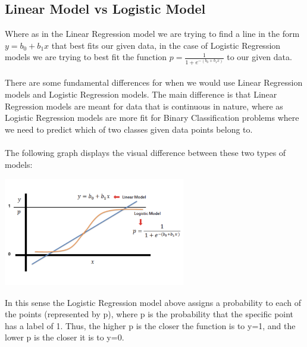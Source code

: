 \documentclass[a4paper]{article}
\begin{document}
\subsection{Linear Model vs Logistic Model}
Where as in the Linear Regression model we are trying to find a line in the form $y = b_{0} + b_{1}x$ that best fits our given data, in the case of Logistic Regression models we are trying to best fit the function $p = \frac{1}{1 + e^{-(b_{0}+b_{1}x)}}$ to our given data.\\\\
There are some fundamental differences for when we would use Linear Regression models and Logistic Regression models. The main difference is that Linear Regression models are meant for data that is continuous in nature, where as Logistic Regression models are more fit for Binary Classification problems where we need to predict which of two classes given data points belong to.\\\\
The following graph displays the visual difference between these two types of models:
\begin{center}
    \includegraphics[width=300px, height=180px]{linear_vs_logistic.png}
\end{center}
In this sense the Logistic Regression model above assigns a probability to each of the points (represented by p), where p is the probability that the specific point has a label of 1. Thus, the higher p is the closer the function is to y=1, and the lower p is the closer it is to y=0.
\end{document}
